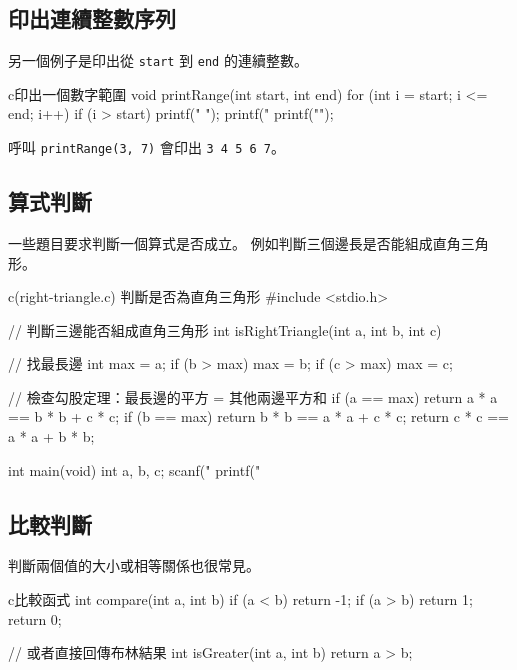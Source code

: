 
\subsection{印出連續整數序列}

另一個例子是印出從 \texttt{start} 到 \texttt{end} 的連續整數。

\begin{code}{c}{印出一個數字範圍}
void printRange(int start, int end) {
    for (int i = start; i <= end; i++) {
        if (i > start) printf(" ");
        printf("%
    }
    printf("\n");
}
\end{code}

呼叫 \texttt{printRange(3, 7)} 會印出 \texttt{3 4 5 6 7}。

\subsection{算式判斷}

一些題目要求判斷一個算式是否成立。 例如判斷三個邊長是否能組成直角三角形。

\begin{example}{c}{(right-triangle.c) 判斷是否為直角三角形}
#include <stdio.h>

// 判斷三邊能否組成直角三角形
int isRightTriangle(int a, int b, int c) {
    // 找最長邊
    int max = a;
    if (b > max) max = b;
    if (c > max) max = c;

    // 檢查勾股定理：最長邊的平方 = 其他兩邊平方和
    if (a == max) {
        return a * a == b * b + c * c;
    }
    if (b == max) {
        return b * b == a * a + c * c;
    }
    return c * c == a * a + b * b;
}

int main(void) {
    int a, b, c;
    scanf("%
    printf("%
}
\end{example}


\subsection{比較判斷}

判斷兩個值的大小或相等關係也很常見。

\begin{code}{c}{比較函式}
int compare(int a, int b) {
    if (a < b) return -1;
    if (a > b) return 1;
    return 0;
}

// 或者直接回傳布林結果
int isGreater(int a, int b) {
    return a > b;
}
\end{code}

